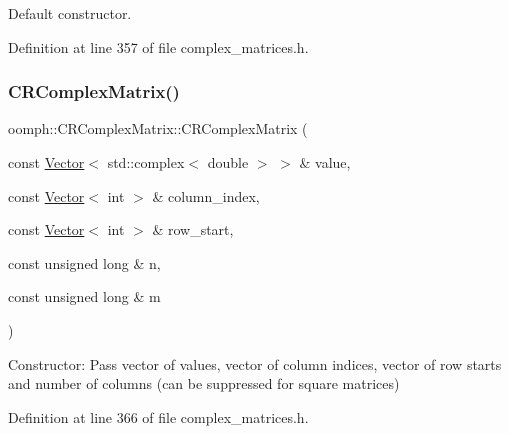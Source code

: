 Default constructor. 



Definition at line 357 of file complex\+\_\+matrices.\+h.

\mbox{\label{classoomph_1_1CRComplexMatrix_a2d7141c949fd722ebe025959745e0e76}} 
\subsubsection{\texorpdfstring{C\+R\+Complex\+Matrix()}{CRComplexMatrix()}\hspace{0.1cm}{\footnotesize\ttfamily [2/3]}}
{\footnotesize\ttfamily oomph\+::\+C\+R\+Complex\+Matrix\+::\+C\+R\+Complex\+Matrix (\begin{DoxyParamCaption}\item[{const \hyperlink{classoomph_1_1Vector}{Vector}$<$ std\+::complex$<$ double $>$ $>$ \&}]{value,  }\item[{const \hyperlink{classoomph_1_1Vector}{Vector}$<$ int $>$ \&}]{column\+\_\+index,  }\item[{const \hyperlink{classoomph_1_1Vector}{Vector}$<$ int $>$ \&}]{row\+\_\+start,  }\item[{const unsigned long \&}]{n,  }\item[{const unsigned long \&}]{m }\end{DoxyParamCaption})\hspace{0.3cm}{\ttfamily [inline]}}



Constructor\+: Pass vector of values, vector of column indices, vector of row starts and number of columns (can be suppressed for square matrices) 



Definition at line 366 of file complex\+\_\+matrices.\+h.

\mbox{\label{classoomph_1_1CRComplexMatrix_aa7065ac556f955e2332c5954ddd2c9fc}} 
